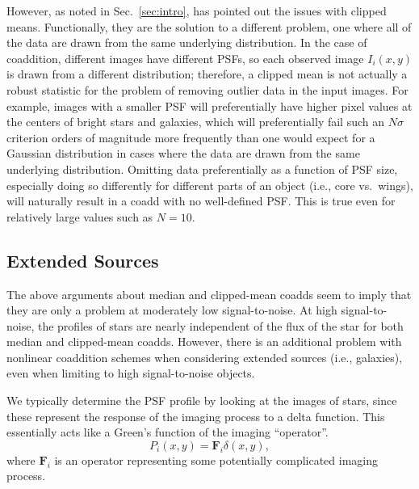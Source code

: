 \documentclass{openjournal}
\newcommand{\irresponse}[1]{{#1}}
\begin{document}
However, as noted in Sec.~\ref{sec:intro}, \citet{2018PASJ...70S...5B} has pointed out the issues with clipped means.  Functionally, they are the solution to a different problem, one where all of the data are drawn from the same underlying distribution.  In the case of coaddition, different images have different PSFs, so \irresponse{each} observed \irresponse{image $I_i(x,y)$} is drawn from a different distribution\irresponse{; therefore, a clipped mean is not actually a robust statistic for the problem of removing outlier data in the input images.}  For example, images with a smaller PSF will preferentially have higher pixel values at the centers of bright stars and galaxies, which will preferentially fail such an $N\sigma$ criterion orders of magnitude more frequently than one would expect for a Gaussian distribution in cases where the data are drawn from the same underlying distribution.  Omitting data preferentially as a function of PSF size, especially doing so differently for different parts of an object (i.e., core vs.\ wings), will naturally result in a coadd with no well-defined PSF. This is true even for relatively large values such as $N=10$.  

\subsection{Extended Sources}\label{subsec:extended}

The above arguments about median and clipped-mean coadds seem to imply that they are only a
problem at moderately low signal-to-noise.  At high signal-to-noise, the profiles of stars are nearly
independent of the flux of the star for both median and clipped-mean coadds.  
However, there is an additional problem with nonlinear coaddition schemes when considering extended sources (i.e., galaxies),
even when limiting to high signal-to-noise objects.

We typically determine the PSF profile by looking at the images of stars, since these represent
the response of the imaging process to a delta function.  This essentially acts like a
Green's function of the imaging ``operator''.
\begin{equation}
    P_i(x,y) = \mathbf{F}_i \delta(x,y),
\end{equation}
where $\mathbf{F}_i$ is an operator representing some potentially complicated imaging process.
\end{document}
